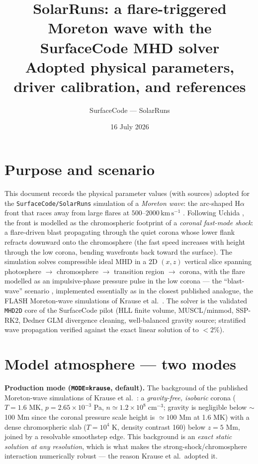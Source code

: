 \documentclass[11pt,a4paper]{article}
\title{SolarRuns: a flare-triggered Moreton wave with the SurfaceCode MHD solver\\
\large Adopted physical parameters, driver calibration, and references}
\author{SurfaceCode --- SolarRuns}
\date{16 July 2026}
\newcommand{\kms}{\,\mathrm{km\,s^{-1}}}
\begin{document}
\maketitle

\section{Purpose and scenario}

This document records the physical parameter values (with sources) adopted for the
\texttt{SurfaceCode/SolarRuns} simulation of a \emph{Moreton wave}: the arc-shaped
H$\alpha$ front that races away from large flares at $500$--$2000\kms$
\cite{Moreton1960,MoretonRamsey1960,Warmuth2004a}. Following Uchida \cite{Uchida1968}, the
front is modelled as the chromospheric footprint of a \emph{coronal fast-mode shock}: a
flare-driven blast propagating through the quiet corona whose lower flank refracts
downward onto the chromosphere (the fast speed increases with height through the low
corona, bending wavefronts back toward the surface). The simulation solves compressible
ideal MHD in a 2D $(x,z)$ vertical slice spanning photosphere $\to$ chromosphere $\to$
transition region $\to$ corona, with the flare modelled as an impulsive-phase pressure
pulse in the low corona --- the ``blast-wave'' scenario
\cite{VrsnakCliver2008,Warmuth2015}, implemented essentially as in the closest published
analogue, the FLASH Moreton-wave simulations of Krause et al.\ \cite{Krause2015}. The
solver is the validated \texttt{MHD2D} core of the SurfaceCode pilot (HLL finite volume,
MUSCL/minmod, SSP-RK2, Dedner GLM divergence cleaning, well-balanced gravity source;
stratified wave propagation verified against the exact linear solution of
\cite{PopescuBraileanu2019} to $<2\%$).

\section{Model atmosphere --- two modes}

\textbf{Production mode (\texttt{MODE=krause}, default).} The background of the published
Moreton-wave simulations of Krause et al.\ \cite{Krause2015}: a \emph{gravity-free,
isobaric} corona ($T=1.6$ MK, $p=2.65\times10^{-3}$ Pa, $n\simeq1.2\times10^{8}\;
\mathrm{cm^{-3}}$; gravity is negligible below $\sim$100 Mm since the coronal pressure
scale height is $\simeq100$ Mm at 1.6 MK) with a dense chromospheric slab ($T=10^{4}$ K,
density contrast 160) below $z=5$ Mm, joined by a resolvable smoothstep edge. This
background is an \emph{exact static solution at any resolution}, which is what makes the
strong-shock/chromosphere interaction numerically robust --- the reason Krause et al.\
adopted it.
\end{document}
